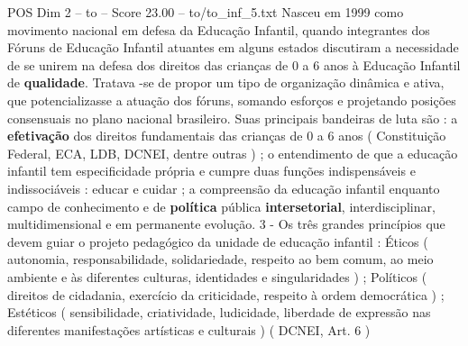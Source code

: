 \begin{textsample}{POS Dim 2 – to – Score 23.00 – to/to\_inf\_5.txt}
Nasceu em 1999 como movimento nacional em defesa da Educação Infantil, quando integrantes dos Fóruns de Educação Infantil atuantes em alguns estados discutiram a necessidade de se unirem na defesa dos direitos das crianças de 0 a 6 anos à Educação Infantil de \textbf{qualidade}.
Tratava -se de propor um tipo de organização dinâmica e ativa, que potencializasse a atuação dos fóruns, somando esforços e projetando posições consensuais no plano nacional brasileiro.
Suas principais bandeiras de luta são : a \textbf{efetivação} dos direitos fundamentais das crianças de 0 a 6 anos ( Constituição Federal, ECA, LDB, DCNEI, dentre outras ) ; o entendimento de que a educação infantil tem especificidade própria e cumpre duas funções indispensáveis e indissociáveis : educar e cuidar ; a compreensão da educação infantil enquanto campo de conhecimento e de \textbf{política} pública \textbf{intersetorial}, interdisciplinar, multidimensional e em permanente evolução. 3 - Os três grandes princípios que devem guiar o projeto pedagógico da unidade de educação infantil : Éticos ( autonomia, responsabilidade, solidariedade, respeito ao bem comum, ao meio ambiente e às diferentes culturas, identidades e singularidades ) ; Políticos ( direitos de cidadania, exercício da criticidade, respeito à ordem democrática ) ; Estéticos ( sensibilidade, criatividade, ludicidade, liberdade de expressão nas diferentes manifestações artísticas e culturais ) ( DCNEI, Art. 6 )

\end{textsample}
